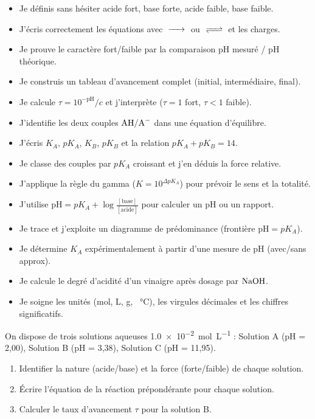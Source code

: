 \documentclass[11pt]{article}
\begin{document}
\begin{aretenir}
\begin{itemize}\setlength{\itemsep}{2pt}
  \item[$\square$] Je définis sans hésiter acide fort, base forte, acide faible, base faible.
  \item[$\square$] J'écris correctement les équations avec $\ce{->}$ ou $\ce{<=>}$ et les charges.
  \item[$\square$] Je prouve le caractère fort/faible par la comparaison pH mesuré / pH théorique.
  \item[$\square$] Je construis un tableau d'avancement complet (initial, intermédiaire, final).
  \item[$\square$] Je calcule $\tau = 10^{-\text{pH}}/c$ et j'interprète ($\tau=1$ fort, $\tau<1$ faible).
  \item[$\square$] J'identifie les deux couples $\ce{AH}/\ce{A-}$ dans une équation d'équilibre.
  \item[$\square$] J'écris $K_A$, $pK_A$, $K_B$, $pK_B$ et la relation $pK_A+pK_B=14$.
  \item[$\square$] Je classe des couples par $pK_A$ croissant et j'en déduis la force relative.
  \item[$\square$] J'applique la règle du gamma ($K=10^{\Delta pK_A}$) pour prévoir le sens et la totalité.
  \item[$\square$] J'utilise $\text{pH} = pK_A + \log\frac{[\text{base}]}{[\text{acide}]}$ pour calculer un pH ou un rapport.
  \item[$\square$] Je trace et j'exploite un diagramme de prédominance (frontière $\text{pH}=pK_A$).
  \item[$\square$] Je détermine $K_A$ expérimentalement à partir d'une mesure de pH (avec/sans approx).
  \item[$\square$] Je calcule le degré d'acidité d'un vinaigre après dosage par $\ce{NaOH}$.
  \item[$\square$] Je soigne les unités (mol, L, g, \SI{}{\celsius}), les virgules décimales et les chiffres significatifs.
\end{itemize}
\end{aretenir}

\begin{exercice}
On dispose de trois solutions aqueuses \SI{1,0e-2}{mol.L^{-1}} : Solution A (pH = 2,00), Solution B (pH = 3,38), Solution C (pH = 11,95).
\begin{enumerate}
  \item Identifier la nature (acide/base) et la force (forte/faible) de chaque solution.
  \item Écrire l'équation de la réaction prépondérante pour chaque solution.
  \item Calculer le taux d'avancement $\tau$ pour la solution B.
\end{enumerate}
\end{exercice}
\end{document}
